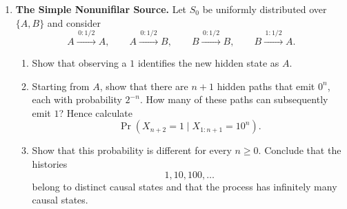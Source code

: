 \begin{exercise}
\begin{enumerate}
      \begin{enumerate}
        \item For each of the length-one histories $0$ and $1$, determine
          whether the current hidden state can be identified exactly.

        \item Starting from each ambiguous history in part (i), consider its
          possible one-symbol extensions. Which extensions resolve the
          ambiguity, and which remain ambiguous? You may use the fact that
          $\epsilon(\emptyset)=\epsilon(11)$. What does this imply for
          histories of the form $1^n$?

        \item Assume additionally that
          $\epsilon(\emptyset)\neq\epsilon(1)$. Show that the causal states
          have shortest representatives
          \[
            \emptyset,\qquad 1,\qquad 0,\qquad 01,
          \]
          and explain why there are no additional causal states. You may
          distinguish causal states using possible and impossible future
          continuations.

        \item Using $\epsilon(\emptyset)=\epsilon(11)$ and assuming
          $\epsilon(\emptyset)\neq\epsilon(1)$, draw the automaton associated
          with the causal-state dynamics.
      \end{enumerate}

    \item \textbf{The Simple Nonunifilar Source.}
      Let $S_0$ be uniformly distributed over $\{A,B\}$ and consider
      \[
        A\xrightarrow{\,0:1/2\,}A,
        \qquad
        A\xrightarrow{\,0:1/2\,}B,
        \qquad
        B\xrightarrow{\,0:1/2\,}B,
        \qquad
        B\xrightarrow{\,1:1/2\,}A.
      \]

      \begin{enumerate}
        \item Show that observing a $1$ identifies the new hidden state as
          $A$.

        \item Starting from $A$, show that there are $n+1$ hidden paths that
          emit $0^n$, each with probability $2^{-n}$. How many of these paths
          can subsequently emit $1$? Hence calculate
          \[
            \Pr(X_{n+2}=1\mid X_{1:n+1}=10^n).
          \]

        \item Show that this probability is different for every $n\geq0$.
          Conclude that the histories
          \[
            1,10,100,\ldots
          \]
          belong to distinct causal states and that the process has infinitely
          many causal states.
      \end{enumerate}
  \end{enumerate}
\end{exercise}
